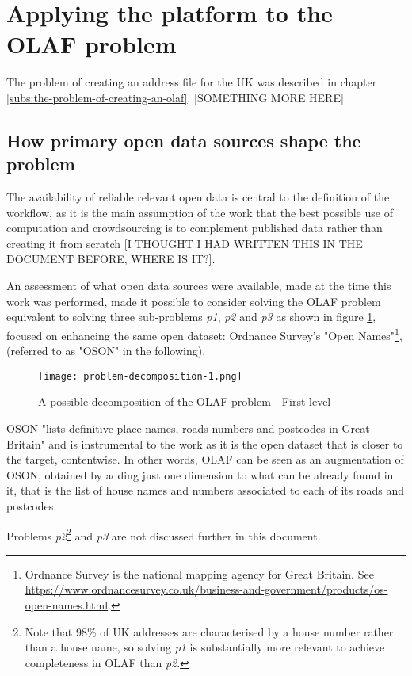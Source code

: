 \section{Applying the platform to the OLAF problem}

The problem of creating an address file for the UK was described in chapter \ref{subs:the-problem-of-creating-an-olaf}. [SOMETHING MORE HERE]

\subsection{How primary open data sources shape the problem}

The availability of reliable relevant open data is central to the definition of the workflow, as it is the main assumption of the work that the best possible use of computation and crowdsourcing is to complement published data rather than creating it from scratch [I THOUGHT I HAD WRITTEN THIS IN THE DOCUMENT BEFORE, WHERE IS IT?]. 

An assessment of what open data sources were available, made at the time this work was performed, made it possible to consider solving the OLAF problem equivalent to solving three sub-problems {\it p1}, {\it p2} and {\it p3} as shown in figure \ref{fig:problem_decomposition_1}, focused on enhancing the same open dataset: Ordnance Survey's "Open Names"\footnote{Ordnance Survey is the national mapping agency for Great Britain. See \url{https://www.ordnancesurvey.co.uk/business-and-government/products/os-open-names.html}.}, (referred to as "OSON" in the following).

\begin{figure}
	\texttt{[image: problem-decomposition-1.png]}
	\caption{A possible decomposition of the OLAF problem - First level}
	\label{fig:problem_decomposition_1}
\end{figure}

OSON "lists definitive place names, roads numbers and postcodes in Great Britain" and is instrumental to the work as it is the open dataset that is closer to the target, contentwise. In other words, OLAF can be seen as an augmentation of OSON, obtained by adding just one dimension to what can be already found in it, that is the list of house names and numbers associated to each of its roads and postcodes. 
    
Problems {\it p2}\footnote{Note that 98\% of UK addresses are characterised by a house number rather than a house name, so solving {\it p1} is substantially more relevant to achieve completeness in OLAF than {\it p2}.} and {\it p3} are not discussed further in this document. 

